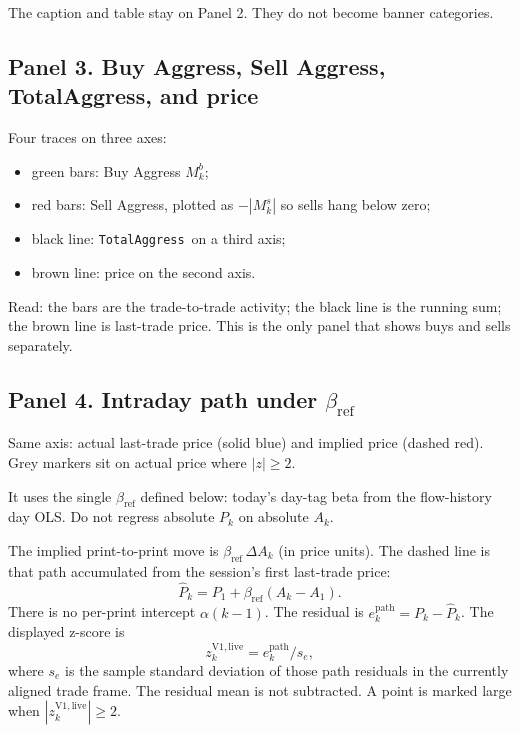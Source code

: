 \documentclass[11pt]{article}
\newcommand{\TotalAggress}{\texttt{TotalAggress}}
\begin{document}
The caption and table stay on Panel 2. They do not become banner categories.

\subsection{Panel 3. Buy Aggress, Sell Aggress, TotalAggress, and price}

Four traces on three axes:
\begin{itemize}
    \item green bars: Buy Aggress $M_k^b$;
    \item red bars: Sell Aggress, plotted as $-|M_k^s|$ so sells hang below zero;
    \item black line: \TotalAggress\ on a third axis;
    \item brown line: price on the second axis.
\end{itemize}

Read: the bars are the trade-to-trade activity; the black line is the running sum; the brown line is last-trade price. This is the only panel that shows buys and sells separately.

\subsection{Panel 4. Intraday path under $\beta_{\mathrm{ref}}$}

Same axis: actual last-trade price (solid blue) and implied price (dashed red). Grey markers sit on actual price where $|z|\geq 2$.

It uses the single $\beta_{\mathrm{ref}}$ defined below: today's day-tag beta from the flow-history day OLS. Do not regress absolute $P_k$ on absolute $A_k$.

The implied print-to-print move is $\beta_{\mathrm{ref}}\,\Delta A_k$ (in price units). The dashed line is that path accumulated from the session's first last-trade price:
\begin{equation}
\widehat{P}_k=P_1+\beta_{\mathrm{ref}}(A_k-A_1).
\end{equation}
There is no per-print intercept $\alpha(k-1)$. The residual is $e_k^{\mathrm{path}}=P_k-\widehat{P}_k$. The displayed z-score is
\begin{equation}
z_k^{\mathrm{V1,live}}=e_k^{\mathrm{path}}/s_e,
\end{equation}
where $s_e$ is the sample standard deviation of those path residuals in the currently aligned trade frame. The residual mean is not subtracted. A point is marked large when $|z_k^{\mathrm{V1,live}}|\geq 2$.
\end{document}
